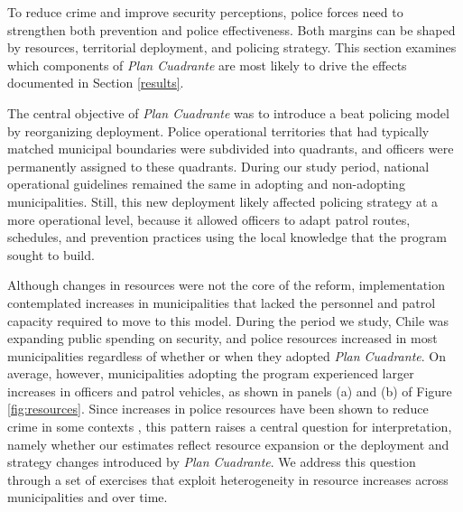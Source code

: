 

To reduce crime and improve security perceptions, police forces need to strengthen both prevention and police effectiveness. Both margins can be shaped by resources, territorial deployment, and policing strategy. This section examines which components of \emph{Plan Cuadrante} are most likely to drive the effects documented in Section \ref{results}. 

The central objective of \emph{Plan Cuadrante} was to introduce a beat policing model by reorganizing deployment. Police operational territories that had typically matched municipal boundaries were subdivided into quadrants, and officers were permanently assigned to these quadrants. During our study period, national operational guidelines remained the same in adopting and non-adopting municipalities. Still, this new deployment likely affected policing strategy at a more operational level, because it allowed officers to adapt patrol routes, schedules, and prevention practices using the local knowledge that the program sought to build.

Although changes in resources were not the core of the reform, implementation contemplated increases in municipalities that lacked the personnel and patrol capacity required to move to this model. During the period we study, Chile was expanding public spending on security, and police resources increased in most municipalities regardless of whether or when they adopted \emph{Plan Cuadrante}. On average, however, municipalities adopting the program experienced larger increases in officers and patrol vehicles, as shown in panels (a) and (b) of Figure \ref{fig:resources}. Since increases in police resources have been shown to reduce crime in some contexts \citep{Evans}, this pattern raises a central question for interpretation, namely whether our estimates reflect resource expansion or the deployment and strategy changes introduced by \emph{Plan Cuadrante}. We address this question through a set of exercises that exploit heterogeneity in resource increases across municipalities and over time.


